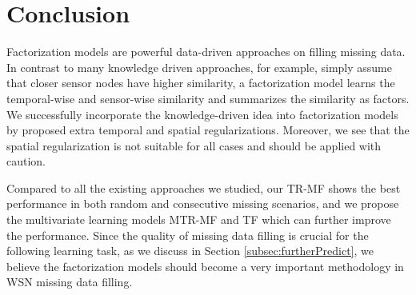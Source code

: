 \section{Conclusion}  \label{sec:conc}
Factorization models are powerful data-driven approaches on filling missing data. In contrast to many knowledge driven approaches, for example, simply assume that closer sensor nodes have higher similarity, a factorization model learns the temporal-wise and sensor-wise similarity and summarizes the similarity as factors. We successfully incorporate the knowledge-driven idea into factorization models by proposed extra temporal and spatial regularizations. Moreover, we see that the spatial regularization is not suitable for all cases and should be applied with caution.  

Compared to all the existing approaches we studied, our TR-MF shows the best performance in both random and consecutive missing scenarios, and we propose the multivariate learning models MTR-MF and TF which can further improve the performance. Since the quality of missing data filling is crucial for the following learning task, as we discuss in Section \ref{subsec:furtherPredict}, we believe the factorization models should become a very important methodology in WSN missing data filling.
